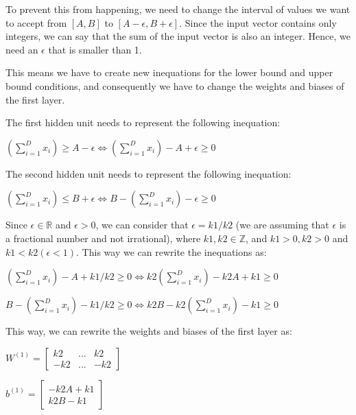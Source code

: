 \documentclass{article}
\begin{document}
\bigskip

To prevent this from happening, we need to change the interval of values we want to accept from $[A, B]$ to $[A - \epsilon, B + \epsilon]$.
Since the input vector contains only integers, we can say that
the sum of the input vector is also an integer. Hence, we need an $\epsilon$ that is smaller than 1. 

This means we have to create new inequations for the lower bound and upper bound conditions, 
and consequently we have to change the weights and biases of the first layer.

The first hidden unit needs to represent the following inequation:

\bigskip

$(\sum_{i=1}^{D} x_i) \geq A - \epsilon \iff (\sum_{i=1}^{D} x_i) - A + \epsilon \geq 0$

\bigskip

The second hidden unit needs to represent the following inequation:

\bigskip

$(\sum_{i=1}^{D} x_i) \leq B + \epsilon \iff B - (\sum_{i=1}^{D} x_i) - \epsilon \geq 0$

\bigskip

Since $\epsilon \in \mathbb{R}$ and $\epsilon > 0$, we can consider that $\epsilon = k1/k2$ (we are assuming that $\epsilon$
is a fractional number and not irrational), where $k1, k2 \in \mathbb{Z}$, 
and $k1 > 0, k2 > 0$ and $k1 < k2 (\epsilon < 1)$. This way we can rewrite the inequations as:

\bigskip

$(\sum_{i=1}^{D} x_i) - A + k1/k2 \geq 0 \iff k2(\sum_{i=1}^{D} x_i) - k2A + k1 \geq 0$

\bigskip

$B - (\sum_{i=1}^{D} x_i) - k1/k2 \geq 0 \iff k2B - k2(\sum_{i=1}^{D} x_i) - k1 \geq 0$

\bigskip

This way, we can rewrite the weights and biases of the first layer as:

\bigskip

\( W^{(1)} = \begin{bmatrix}
    k2  & ... & k2  \\
    -k2 & ... & -k2
\end{bmatrix}
\)

\medskip

\(b^{(1)} = \begin{bmatrix}
    -k2A + k1 \\
    k2B - k1
\end{bmatrix}
\)
\end{document}
